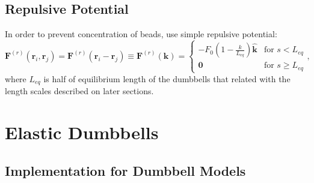 \documentclass[10pt, a4paper]{article}
\begin{document}
\subsection{Repulsive Potential}
In order to prevent concentration of beads, \textcite{VandenBrule:1995fq} use simple repulsive potential:
\begin{equation}
  \mathbf{F}^{(r)}(\mathbf{r}_i, \mathbf{r}_j) = \mathbf{F}^{(r)}(\mathbf{r}_i - \mathbf{r}_j) \equiv \mathbf{F}^{(r)}(\mathbf{k}) = \left\{\begin{array}{cc} -F_0 \left(1 - \frac{k}{L_{eq}}\right)\hat{\mathbf{k}} & \textrm{for } s<L_{eq}\\
      \mathbf{0} & \textrm{for } s\geq L_{eq}
    \end{array}\right.,\label{eq:repulsive_force}
\end{equation}
where $L_{eq}$ is half of equilibrium length of the dumbbells that related with the length scales described on later sections.


\section{Elastic Dumbbells}
\subsection{Implementation for Dumbbell Models}
\end{document}
